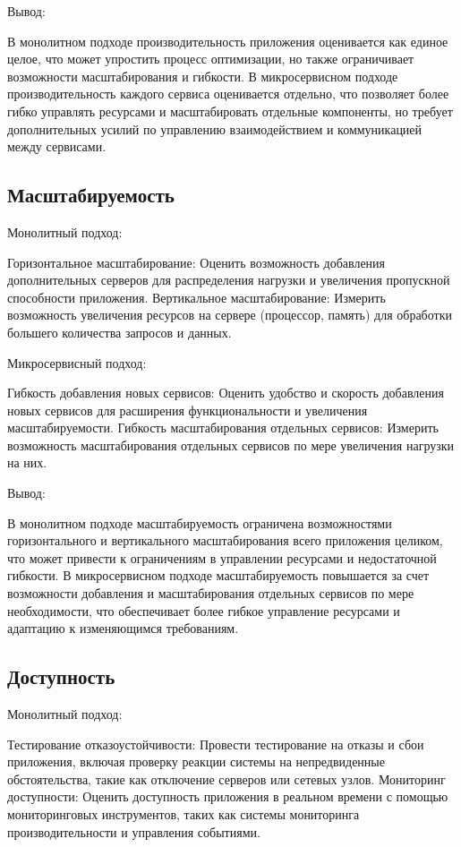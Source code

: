 Вывод:

    В монолитном подходе производительность приложения оценивается как единое целое, что может упростить процесс оптимизации, но также ограничивает возможности масштабирования и гибкости.
    В микросервисном подходе производительность каждого сервиса оценивается отдельно, что позволяет более гибко управлять ресурсами и масштабировать отдельные компоненты, но требует дополнительных усилий по управлению взаимодействием и коммуникацией между сервисами.

\subsection{Масштабируемость}

Монолитный подход:

    Горизонтальное масштабирование: Оценить возможность добавления дополнительных серверов для распределения нагрузки и увеличения пропускной способности приложения.
    Вертикальное масштабирование: Измерить возможность увеличения ресурсов на сервере (процессор, память) для обработки большего количества запросов и данных.

Микросервисный подход:

    Гибкость добавления новых сервисов: Оценить удобство и скорость добавления новых сервисов для расширения функциональности и увеличения масштабируемости.
    Гибкость масштабирования отдельных сервисов: Измерить возможность масштабирования отдельных сервисов по мере увеличения нагрузки на них.

Вывод:

    В монолитном подходе масштабируемость ограничена возможностями горизонтального и вертикального масштабирования всего приложения целиком, что может привести к ограничениям в управлении ресурсами и недостаточной гибкости.
    В микросервисном подходе масштабируемость повышается за счет возможности добавления и масштабирования отдельных сервисов по мере необходимости, что обеспечивает более гибкое управление ресурсами и адаптацию к изменяющимся требованиям.

\subsection{Доступность}

Монолитный подход:

    Тестирование отказоустойчивости: Провести тестирование на отказы и сбои приложения, включая проверку реакции системы на непредвиденные обстоятельства, такие как отключение серверов или сетевых узлов.
    Мониторинг доступности: Оценить доступность приложения в реальном времени с помощью мониторинговых инструментов, таких как системы мониторинга производительности и управления событиями.

